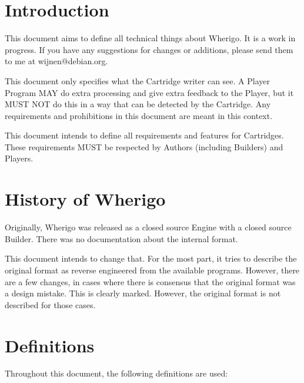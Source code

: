 \documentclass{article}
\begin{document}
\section{Introduction}
This document aims to define all technical things about Wherigo. It is a work
in progress. If you have any suggestions for changes or additions, please send
them to me at wijnen@debian.org.

This document only specifies what the Cartridge writer can see. A Player
Program MAY do extra processing and give extra feedback to the Player, but it
MUST NOT do this in a way that can be detected by the Cartridge. Any
requirements and prohibitions in this document are meant in this context.

This document intends to define all requirements and features for Cartridges.
These requirements MUST be respected by Authors (including Builders) and
Players.


\section{History of Wherigo}
Originally, Wherigo was released as a closed source Engine with a closed source
Builder. There was no documentation about the internal format.

This document intends to change that. For the most part, it tries to describe
the original format as reverse engineered from the available programs. However,
there are a few changes, in cases where there is consensus that the original
format was a design mistake. This is clearly marked. However, the original
format is not described for those cases.


\section{Definitions}
Throughout this document, the following definitions are used:
\end{document}
